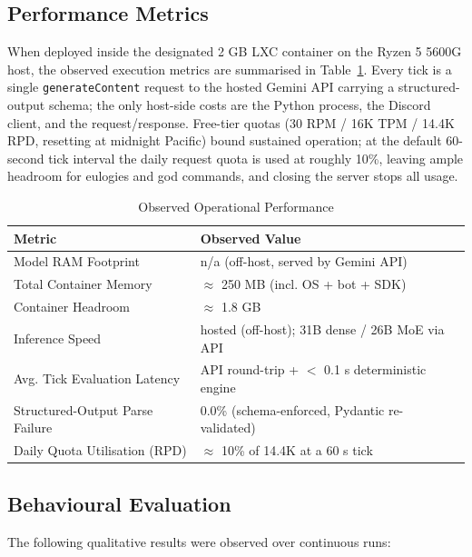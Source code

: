 \documentclass[10pt,a4paper]{article}
\begin{document}
\subsection{Performance Metrics}
When deployed inside the designated 2 GB LXC container on the Ryzen 5 5600G host, the observed execution metrics are summarised in Table~\ref{tab:metrics}. Every tick is a single \texttt{generateContent} request to the hosted Gemini API carrying a structured-output schema; the only host-side costs are the Python process, the Discord client, and the request/response. Free-tier quotas (30 RPM / 16K TPM / 14.4K RPD, resetting at midnight Pacific) bound sustained operation; at the default 60-second tick interval the daily request quota is used at roughly 10\%, leaving ample headroom for eulogies and god commands, and closing the server stops all usage.

\begin{table}[htbp]
\centering
\caption{Observed Operational Performance}
\label{tab:metrics}
\begin{tabular}{@{}ll@{}}
\toprule
\textbf{Metric} & \textbf{Observed Value} \\
\midrule
Model RAM Footprint & n/a (off-host, served by Gemini API) \\
Total Container Memory & $\approx$ 250 MB (incl. OS + bot + SDK) \\
Container Headroom & $\approx$ 1.8 GB \\
Inference Speed & hosted (off-host); 31B dense / 26B MoE via API \\
Avg. Tick Evaluation Latency & API round-trip + $<$ 0.1 s deterministic engine \\
Structured-Output Parse Failure & 0.0\% (schema-enforced, Pydantic re-validated) \\
Daily Quota Utilisation (RPD) & $\approx$ 10\% of 14.4K at a 60 s tick \\
\bottomrule
\end{tabular}
\end{table}

\subsection{Behavioural Evaluation}
The following qualitative results were observed over continuous runs:
\end{document}
